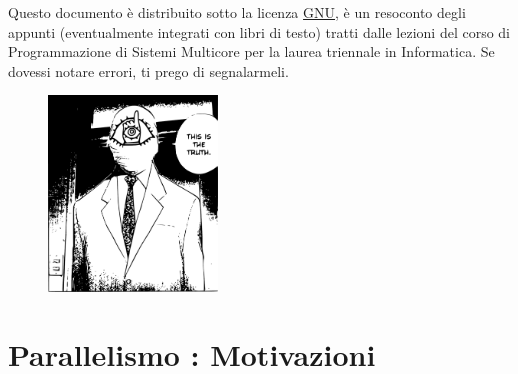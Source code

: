 \documentclass[10pt, letterpaper]{report}
\begin{document}
\newpage
\pagecolor{cartaRiciclata}%
\large
Questo documento è distribuito sotto la licenza 
\color{blue}\href{https://www.gnu.org/licenses/fdl-1.3.txt}{GNU}\color{black},  
è un resoconto degli appunti (eventualmente integrati con libri di testo) tratti dalle lezioni del corso di Programmazione di Sistemi Multicore
\hphantom{a}per la laurea 
triennale in Informatica. Se dovessi notare errori, ti prego di segnalarmeli.
\vfill
\begin{figure}[h!]
    \raggedright
    \includegraphics[width=0.4\textwidth,right ]{../../preamble/tomodachi.pdf} 
\end{figure}
\newpage %
\normalsize
\tableofcontents 
\newpage

\fancyhf{}
\fancyhead[L]{\nouppercase{\leftmark}}
\fancyfoot[C]{\thepage}



\chapter{Parallelismo : Motivazioni}
\end{document}

